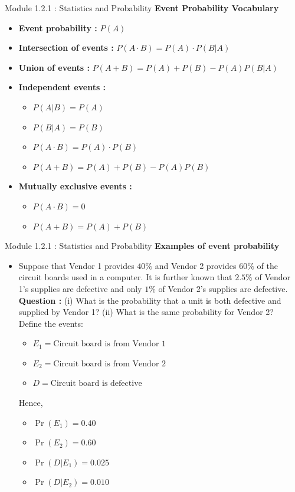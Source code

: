 \documentclass{beamer}
\begin{document}
\begin{frame}{Module 1.2.1 : Statistics and Probability}
\small
\textbf{Event Probability Vocabulary}
\begin{itemize}
\item \textbf{Event probability : } $P(A)$
\item \textbf{Intersection of events : } $P(A \cdot B) = P(A) \cdot P(B|A) $
\item \textbf{Union of events : } $P(A + B) = P(A) + P(B) - P(A) P(B|A)$
\item \textbf{Independent events : } 
\begin{itemize}
\item $P(A|B) = P(A)$
\item $P(B|A) = P(B)$
\item $P(A \cdot B) = P(A) \cdot P(B)$
\item $P(A + B) = P(A) + P(B) - P(A)P(B)$
\end{itemize}
\item \textbf{Mutually exclusive events : } 
\begin{itemize}
\item $P(A \cdot B) = 0$
\item $P(A+B) = P(A) + P(B)$
\end{itemize}
\end{itemize}
\end{frame}

\begin{frame}{Module 1.2.1 : Statistics and Probability}
\small
\textbf{Examples of event probability}
\begin{itemize}
\item
\scriptsize
Suppose that Vendor 1 provides $40\%$ and Vendor 2 provides $60\%$ of the
circuit boards used in a computer. It is further known that $2.5\%$ of
Vendor 1's supplies are defective and only $1\%$ of Vendor 2's supplies
are defective. \\ \vspace{0.25cm}
\textbf{Question :} (i) What is the probability that a unit is both defective and supplied by
Vendor 1? (ii) What is the same probability for Vendor 2? \\ \vspace{0.25cm}
Define the events:
\begin{itemize}
\scriptsize
\item $E_1 = \text{Circuit board is from Vendor 1}$
\item $E_2 = \text{Circuit board is from Vendor 2}$
\item $D = \text{Circuit board is defective}$
\end{itemize}
Hence,
\begin{itemize}
\scriptsize
\item $\Pr(E_1)=0.40$
\item $\Pr(E_2)=0.60$
\item $\Pr(D|E_1)=0.025$
\item $\Pr(D|E_2)=0.010$
\end{itemize}
\end{itemize}
\end{frame}
\end{document}
